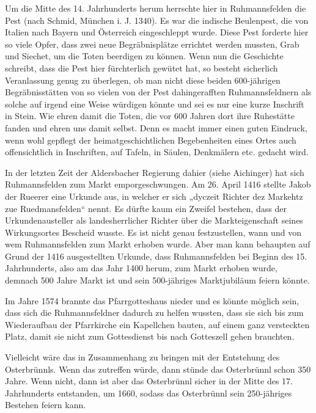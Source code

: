 \documentclass[12pt,a4paper]{book}
\begin{document}
Um die Mitte des 14. Jahrhunderts herum herrschte hier in Ruhmannsfelden
die Pest (nach Schmid, München i. J. 1340). Es war die indische
Beulenpest, die von Italien nach Bayern und Österreich eingeschleppt
wurde. Diese Pest forderte hier so viele Opfer, dass zwei neue
Begräbnisplätze errichtet werden mussten, Grab und Siechet, um die Toten
beerdigen zu können. Wenn nun die Geschichte schreibt, dass die Pest
hier fürchterlich gewütet hat, so besteht sicherlich Veranlassung genug
zu überlegen, ob man nicht diese beiden 600-jährigen Begräbnisstätten
von so vielen von der Pest dahingerafften Ruhmannsfeldnern als solche
auf irgend eine Weise würdigen könnte und sei es nur eine kurze
Inschrift in Stein. Wie ehren damit die Toten, die vor 600 Jahren dort
ihre Ruhestätte fanden und ehren uns damit selbst. Denn es macht immer
einen guten Eindruck, wenn wohl gepflegt der heimatgeschichtlichen
Begebenheiten eines Ortes auch offensichtlich in Inschriften, auf
Tafeln, in Säulen, Denkmälern etc. gedacht wird.

In der letzten Zeit der Aldersbacher Regierung dahier (siehe Aichinger)
hat sich Ruhmannsfelden zum Markt emporgeschwungen. Am 26. April 1416
stellte Jakob der Rueerer eine Urkunde aus, in welcher er sich „dyczeit
Richter dez Markehtz zue Ruedmansfelden“ nennt. Es dürfte kaum ein
Zweifel bestehen, dass der Urkundenausteller als landesherrlicher
Richter über die Markteigenschaft seines Wirkungsortes Bescheid wusste.
Es ist nicht genau festzustellen, wann und von wem Ruhmannsfelden zum
Markt erhoben wurde. Aber man kann behaupten auf Grund der 1416
ausgestellten Urkunde, dass Ruhmannsfelden bei Beginn des 15.
Jahrhunderts, also am das Jahr 1400 herum, zum Markt erhoben wurde,
demnach 500 Jahre Markt ist und sein 500-jähriges Marktjubiläum feiern
könnte.

Im Jahre 1574 brannte das Pfarrgotteshaus nieder und es könnte möglich
sein, dass sich die Ruhmannsfeldner dadurch zu helfen wussten, dass sie
sich bis zum Wiederaufbau der Pfarrkirche ein Kapellchen bauten, auf
einem ganz versteckten Platz, damit sie nicht zum Gottesdienst bis nach
Gotteszell gehen brauchten.

Vielleicht wäre das in Zusammenhang zu bringen mit der Entstehung des
Osterbrünnls. Wenn das zutreffen würde, dann stünde das Osterbrünnl
schon 350 Jahre. Wenn nicht, dann ist aber das Osterbrünnl sicher in der
Mitte des 17. Jahrhunderts entstanden, um 1660, sodass das Osterbrünnl
sein 250-jähriges Bestehen feiern kann.
\end{document}
